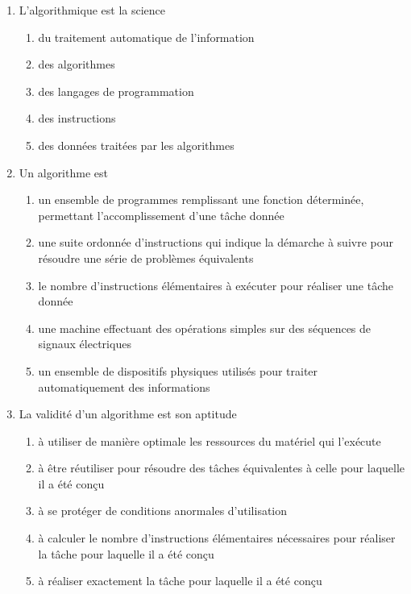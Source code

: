 \begin{td}
\begin{enumerate}
\begin{enumerate}
	\end{enumerate}
\item L'algorithmique est la science
	\begin{enumerate}
	\item du traitement automatique de l'information
	\item des algorithmes
	\item des langages de programmation
	\item des instructions
	\item des données traitées par les algorithmes
	\end{enumerate}
\item Un algorithme est
	\begin{enumerate}
	\item un ensemble de programmes remplissant une fonction déterminée,
		permettant l'accomplissement d'une tâche donnée
	\item une suite ordonnée d'instructions qui indique la démarche 
		à suivre pour résoudre une série de problèmes équivalents
	\item le nombre d'instructions élémentaires à exécuter pour
		réaliser une tâche donnée
	\item une machine effectuant des opérations simples sur des séquences 
		de signaux électriques
	\item un ensemble de dispositifs physiques utilisés pour traiter
		automatiquement des informations
	\end{enumerate}
\item La validité d'un algorithme est son aptitude
	\begin{enumerate}
	\item à utiliser de manière optimale les ressources du matériel qui l'exécute
	\item à être réutiliser pour résoudre des tâches équivalentes à celle pour 
		laquelle il a été conçu
	\item à se protéger de conditions anormales d'utilisation
	\item à calculer le nombre d'instructions élémentaires nécessaires pour
		réaliser la tâche pour laquelle il a été conçu
	\item à réaliser exactement la tâche pour laquelle il a été conçu

\end{enumerate}
\end{enumerate}
\end{td}

